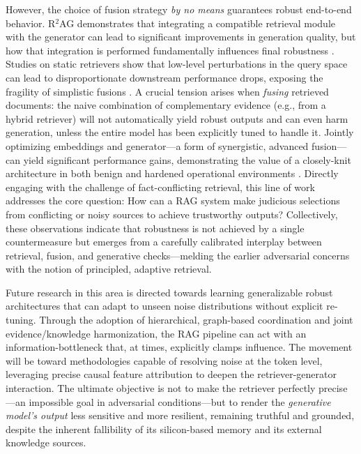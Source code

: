 \documentclass[11pt,a4paper]{article}
\begin{document}
However, the choice of fusion strategy \emph{by no means} guarantees robust end-to-end behavior. R$^{2}$AG demonstrates that integrating a compatible retrieval module with the generator can lead to significant improvements in generation quality, but how that integration is performed fundamentally influences final robustness \cite{arxiv:2505.08728v2}. Studies on static retrievers show that low-level perturbations in the query space can lead to disproportionate downstream performance drops, exposing the fragility of simplistic fusions \cite{arxiv:2507.06956v1}. A crucial tension arises when \emph{fusing} retrieved documents: the naive combination of complementary evidence (e.g., from a hybrid retriever) will not automatically yield robust outputs and can even harm generation, unless the entire model has been explicitly tuned to handle it. Jointly optimizing embeddings and generator---a form of synergistic, advanced fusion---can yield significant performance gains, demonstrating the value of a closely-knit architecture in both benign and hardened operational environments \cite{arxiv:2510.01600v2}. Directly engaging with the challenge of fact-conflicting retrieval, this line of work addresses the core question: How can a RAG system make judicious selections from conflicting or noisy sources to achieve trustworthy outputs? Collectively, these observations indicate that robustness is not achieved by a single countermeasure but emerges from a carefully calibrated interplay between retrieval, fusion, and generative checks---melding the earlier adversarial concerns with the notion of principled, adaptive retrieval.

Future research in this area is directed towards learning generalizable robust architectures that can adapt to unseen noise distributions without explicit re-tuning. Through the adoption of hierarchical, graph-based coordination and joint evidence/knowledge harmonization, the RAG pipeline can act with an information-bottleneck that, at times, explicitly clamps influence. The movement will be toward methodologies capable of resolving noise at the token level, leveraging precise causal feature attribution to deepen the retriever-generator interaction. The ultimate objective is not to make the retriever perfectly precise---an impossible goal in adversarial conditions---but to render the \emph{generative model's output} less sensitive and more resilient, remaining truthful and grounded, despite the inherent fallibility of its silicon-based memory and its external knowledge sources.
\end{document}

